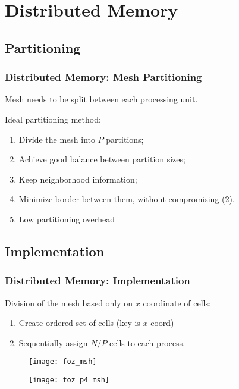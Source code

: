 \section{Distributed Memory}


\subsection{Partitioning}

\begin{frame}
	\frametitle{Distributed Memory: Mesh Partitioning}

	Mesh needs to be split between each processing unit.
	\begin{block}{Ideal partitioning method:}
		\begin{enumerate}
			\item Divide the mesh into $P$ partitions;
			\item Achieve good balance between partition sizes;
			\item Keep neighborhood information;
			\item Minimize border between them, without compromising (2).
			\item Low partitioning overhead
		\end{enumerate}
	\end{block}

\end{frame}

\subsection{Implementation}

\begin{frame}
	\frametitle{Distributed Memory: Implementation}

	Division of the mesh based only on $x$ coordinate of cells:
	\begin{enumerate}
		\item Create ordered set of cells (key is $x$ coord)
		\item Sequentially assign $N/P$ cells to each process.
	\end{enumerate}

	\begin{multicols}{2}
		\begin{figure}
			\begin{center}
				\texttt{[image: foz\_msh]}
			\end{center}
		\end{figure}
		\pause
		\begin{figure}
			\begin{center}
				\texttt{[image: foz\_p4\_msh]}
			\end{center}
		\end{figure}
	\end{multicols}
\end{frame}

